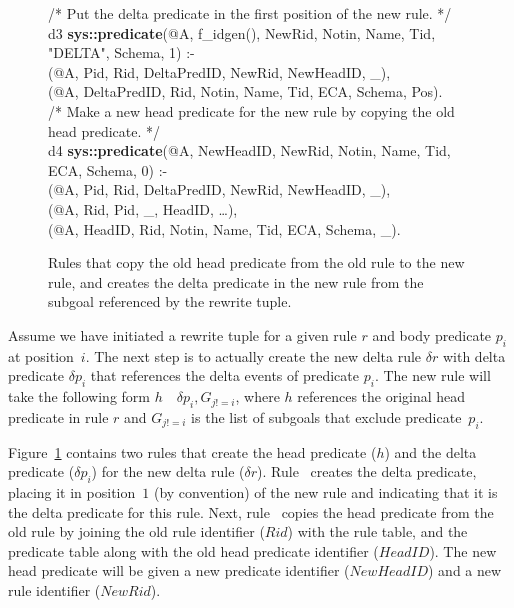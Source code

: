 \begin{figure}[!t]
\ssp
\centering
\begin{boxedminipage}{\linewidth}
/* Put the delta predicate in the first position of the new rule. */ \\
d3 {\bf sys::predicate}(@A, f\_idgen(), NewRid, Notin, Name, Tid, "DELTA", Schema, 1) :- \\
(@A, Pid, Rid, DeltaPredID, NewRid, NewHeadID, \_), \\
(@A, DeltaPredID, Rid, Notin, Name, Tid, ECA, Schema, Pos). \\

/* Make a new head predicate for the new rule by copying the old head predicate. */ \\
d4 {\bf sys::predicate}(@A, NewHeadID, NewRid, Notin, Name, Tid, ECA, Schema, 0) :- \\
(@A, Pid, Rid, DeltaPredID, NewRid, NewHeadID, \_), \\
(@A, Rid, Pid, \_, HeadID, \ldots), \\
(@A, HeadID, Rid, Notin, Name, Tid, ECA, Schema, \_).

\end{boxedminipage}
\caption{\label{ch:evita:fig:delta2}Rules that copy the old head predicate from the old rule
to the new rule, and creates the delta predicate in the new rule from the subgoal referenced
by the rewrite tuple.}
\end{figure}

Assume we have initiated a rewrite tuple for a given rule $r$ and body
predicate $p_i$ at position~$i$.  The next step is to actually create the new
delta rule $\delta r$ with delta predicate $\delta p_i$ that references the
delta events of predicate $p_i$.  The new rule will take the following form
$h$~\ol{:-}~$\delta p_i, G_{j!=i}$, where $h$ references the original head predicate
in rule $r$ and $G_{j!=i}$ is the list of subgoals that exclude
predicate~$p_i$.

Figure~\ref{ch:evita:fig:delta2} contains two rules that create the head
predicate ($h$) and the delta predicate ($\delta p_i$) for the new delta rule
($\delta r$).  Rule~ creates the delta predicate, placing it in
position~$1$ (by convention) of the new rule and indicating that it is the
delta predicate for this rule.  Next, rule~ copies the head predicate
from the old rule by joining the old rule identifier ($Rid$) with the rule
table, and the predicate table along with the old head predicate identifier
($HeadID$).  The new head predicate will be given a new predicate identifier
($NewHeadID$) and a new rule identifier ($NewRid$).


